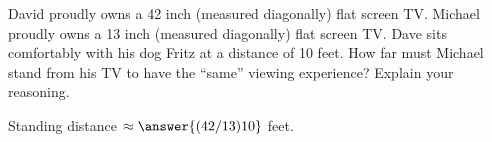 \documentclass[nooutcomes]{ximera}
\begin{document}
\begin{question}
David proudly owns a 42 inch (measured diagonally) flat screen
  TV. Michael proudly owns a 13 inch (measured diagonally) flat screen
  TV. Dave sits comfortably with his dog Fritz at a distance of 10
  feet. How far must Michael stand from his TV to have the ``same''
  viewing experience?  Explain your reasoning.

Standing distance $\approx \answer{(42/13)10}$ feet.  
\end{question}

\end{document}
